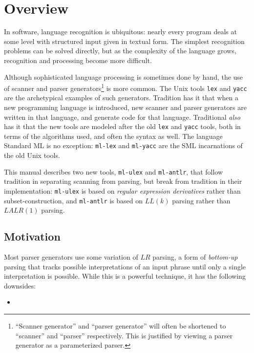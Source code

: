 \chapter{Overview}\label{chap:overview}

In software, language recognition is ubiquitous: nearly every program deals at some level with structured input given in textual form.  The simplest recognition problems can be solved directly, but as the complexity of the language grows, recognition and processing become more difficult.  

Although sophisticated language processing is sometimes done by hand, the use of scanner and parser generators\footnote{
  ``Scanner generator'' and ``parser generator'' will often be shortened to ``scanner'' and ``parser'' respectively.  This is justified by viewing a parser generator as a parameterized parser.
} is more common.  The Unix tools {\tt lex} and {\tt yacc} are the archetypical examples of such generators.  Tradition has it that when a new programming language is introduced, new scanner and parser generators are written in that language, and generate code for that language.  Traditional \emph{also} has it that the new tools are modeled after the old {\tt lex} and {\tt yacc} tools, both in terms of the algorithms used, and often the syntax as well.  The language Standard ML is no exception: {\tt ml-lex} and {\tt ml-yacc} are the SML incarnations of the old Unix tools.

This manual describes two new tools, {\tt ml-ulex} and {\tt ml-antlr}, that follow tradition in separating scanning from parsing, but break from tradition in their implementation: {\tt ml-ulex} is based on \emph{regular expression derivatives} rather than subset-construction, and {\tt ml-antlr} is based on $LL(k)$ parsing rather than $LALR(1)$ parsing.   

\section{Motivation}

Most parser generators use some variation of $LR$ parsing, a form of \emph{bottom-up} parsing that tracks possible interpretations of an input phrase until only a single interpretation is possible.  While this is a powerful technique, it has the following downsides:
\begin{itemize}
  \item 
\end{itemize} 

